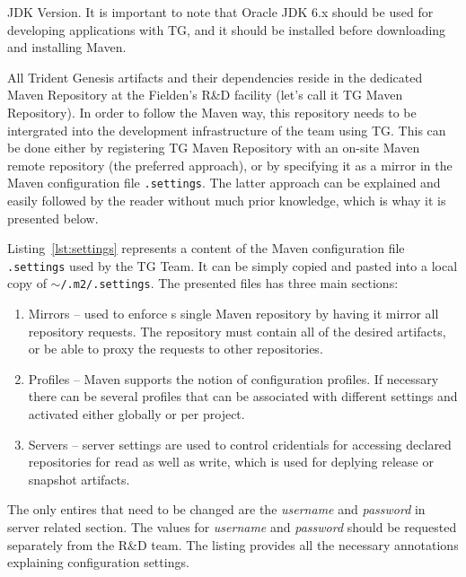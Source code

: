   \begin{notebox}{JDK Version.}{\label{mb:java}}
    It is important to note that Oracle JDK 6.x should be used for developing applications with TG, and it should be installed before downloading and installing Maven. 
  \end{notebox}
  
  All Trident Genesis artifacts and their dependencies reside in the dedicated Maven Repository at the Fielden's R\&D facility (let's call it TG Maven Repository).
  In order to follow the Maven way, this repository needs to be intergrated into the development infrastructure of the team using TG.
  This can be done either by registering TG Maven Repository with an on-site Maven remote repository (the preferred approach), or by specifying it as a mirror in the Maven configuration file \texttt{.settings}.
  The latter approach can be explained and easily followed by the reader without much prior knowledge, which is whay it is presented below.
  
  Listing~\ref{lst:settings} represents a content of the Maven configuration file \texttt{.settings} used by the TG Team.
  It can be simply copied and pasted into a local copy of \texttt{$\sim$/.m2/.settings}.
  The presented files has three main sections:
  \begin{enumerate}
    \item Mirrors -- used to enforce s single Maven repository by having it mirror all repository requests. 
	  The repository must contain all of the desired artifacts, or be able to proxy the requests to other repositories.
    \item Profiles -- Maven supports the notion of configuration profiles. 
	  If necessary there can be several profiles that can be associated with different settings and activated either globally or per project.
    \item Servers -- server settings are used to control cridentials for accessing declared repositories for read as well as write, which is used for deplying release or snapshot artifacts.
  \end{enumerate}
  The only entires that need to be changed are the \emph{username} and \emph{password} in server related section.
  The values for \emph{username} and \emph{password}  should be requested separately from the R\&D team.
  The listing provides all the necessary annotations explaining configuration settings.
  
